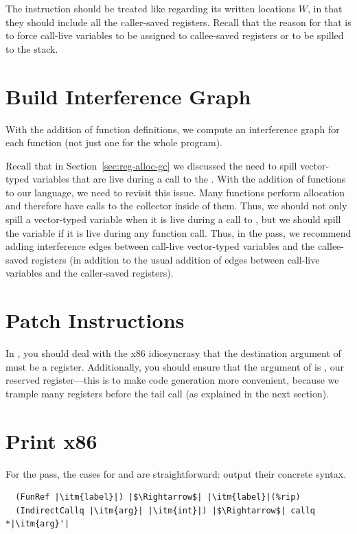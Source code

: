 \documentclass[11pt]{book}
\begin{document}
The  instruction should be treated like
 regarding its written locations $W$, in that they should
include all the caller-saved registers. Recall that the reason for
that is to force call-live variables to be assigned to callee-saved
registers or to be spilled to the stack.

\section{Build Interference Graph}

With the addition of function definitions, we compute an interference
graph for each function (not just one for the whole program).

Recall that in Section~\ref{sec:reg-alloc-gc} we discussed the need to
spill vector-typed variables that are live during a call to the
.  With the addition of functions to our language, we
need to revisit this issue. Many functions perform allocation and
therefore have calls to the collector inside of them. Thus, we should
not only spill a vector-typed variable when it is live during a call
to , but we should spill the variable if it is live
during any function call. Thus, in the  pass,
we recommend adding interference edges between call-live vector-typed
variables and the callee-saved registers (in addition to the usual
addition of edges between call-live variables and the caller-saved
registers).

\section{Patch Instructions}

In , you should deal with the x86
idiosyncrasy that the destination argument of  must be a
register. Additionally, you should ensure that the argument of
 is , our reserved register---this is to make
code generation more convenient, because we trample many registers
before the tail call (as explained in the next section).

\section{Print x86}

For the  pass, the cases for  and
 are straightforward: output their concrete
syntax.
\begin{lstlisting}
  (FunRef |\itm{label}|) |$\Rightarrow$| |\itm{label}|(%rip)
  (IndirectCallq |\itm{arg}| |\itm{int}|) |$\Rightarrow$| callq *|\itm{arg}'|
\end{lstlisting}
\end{document}

